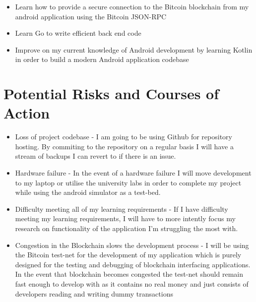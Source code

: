 \documentclass{article}
\begin{document}
\begin{itemize}

\item Learn how to provide a secure connection to the Bitcoin blockchain from
    my android application using the Bitcoin JSON-RPC

\item Learn Go to write efficient back end code

\item Improve on my current knowledge of Android development by learning
    Kotlin in order to build a modern Android application codebase 

\end{itemize}

\section{Potential Risks and Courses of Action}

\begin{itemize}

\item Loss of project codebase - I am going to be using Github for repository
  hosting. By commiting to the repository on a regular basis I will have a
  stream of backups I can revert to if there is an issue. 

\item Hardware failure - In the event of a hardware failure I will move
  development to my laptop or utilise the university labs in order to complete
  my project while using the android simulator as a test-bed.

\item Difficulty meeting all of my learning requirements - If I have difficulty
  meeting my learning requirements, I will have to more intently focus my
  research on functionality of the application I'm struggling the most with.

\item Congestion in the Blockchain slows the development process - I will be
  using the Bitcoin test-net for the development of my application which is
  purely designed for the testing and debugging of blockchain interfacing
  applications. In the event that blockchain becomes congested the test-net
  should remain fast enough to develop with as it contains no real money and
  just consists of developers reading and writing dummy transactions

\end{itemize}
\end{document}
